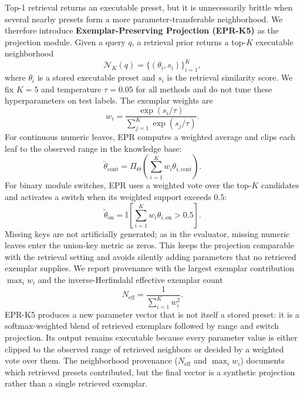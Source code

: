 Top-1 retrieval returns an executable preset, but it is unnecessarily brittle when several nearby presets form a more parameter-transferable neighborhood. We therefore introduce \textbf{Exemplar-Preserving Projection (EPR-K5)} as the projection module. Given a query $q$, a retrieval prior returns a top-$K$ executable neighborhood
\begin{equation}
	\mathcal{N}_K(q)=\{(\theta_i,s_i)\}_{i=1}^{K},
\end{equation}
where $\theta_i$ is a stored executable preset and $s_i$ is the retrieval similarity score. We fix $K=5$ and temperature $\tau=0.05$ for all methods and do not tune these hyperparameters on test labels. The exemplar weights are
\begin{equation}
	w_i=\frac{\exp(s_i/\tau)}{\sum_{j=1}^{K}\exp(s_j/\tau)}.
\end{equation}
For continuous numeric leaves, EPR computes a weighted average and clips each leaf to the observed range in the knowledge base:
\begin{equation}
	\tilde{\theta}_{\mathrm{cont}}=
	\Pi_{\Theta}\left(\sum_{i=1}^{K}w_i\theta_{i,\mathrm{cont}}\right).
\end{equation}
For binary module switches, EPR uses a weighted vote over the top-$K$ candidates and activates a switch when its weighted support exceeds $0.5$:
\begin{equation}
	\tilde{\theta}_{\mathrm{on}}=
	\mathbb{I}\left[\sum_{i=1}^{K}w_i\theta_{i,\mathrm{on}}>0.5\right].
\end{equation}
Missing keys are not artificially generated; as in the evaluator, missing numeric leaves enter the union-key metric as zeros. This keeps the projection comparable with the retrieval setting and avoids silently adding parameters that no retrieved exemplar supplies. We report provenance with the largest exemplar contribution $\max_i w_i$ and the inverse-Herfindahl effective exemplar count
\begin{equation}
	N_{\mathrm{eff}}=\frac{1}{\sum_{i=1}^{K}w_i^2}.
\end{equation}
EPR-K5 produces a new parameter vector that is not itself a stored preset: it is a softmax-weighted blend of retrieved exemplars followed by range and switch projection. Its output remains executable because every parameter value is either clipped to the observed range of retrieved neighbors or decided by a weighted vote over them. The neighborhood provenance ($N_{\mathrm{eff}}$ and $\max_i w_i$) documents which retrieved presets contributed, but the final vector is a synthetic projection rather than a single retrieved exemplar.

